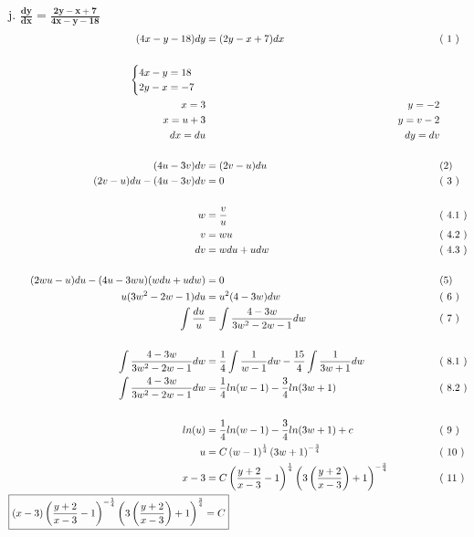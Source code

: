 \documentclass{article}
\newcommand{\newLine}[3]{ #1 & = #2 && \text{(#3)}\\ }
\newcommand{\finalAnswer}[2]{ \Aboxed{ #1 & = #2 } }
\newcommand{\p}[1]{ \left( #1 \right) }
\newcommand{\newProblem}[2]{ \hspace{10mm} #1. $
\boldsymbol{ #2 }
$  \break }
\begin{document}
\begin{flushleft}
        \newProblem{j}{ \frac{dy}{dx} = \frac{2y-x+7}{4x-y-18} }
            \begin{align*}
                \newLine{ ( 4x-y-18 )dy } { (2y-x+7)dx } { 1 }
                \\
                    \begin{cases}
                        4x - y = 18\\
                        2y - x = -7
                    \end{cases}\\
                x = 3 && y = -2 \\
                x = u + 3 && y = v -2 \\
                dx = du && dy = dv\\
                \\
                \newLine{ ( 4u - 3v )dv } { (2v-u)du } {2}
                \newLine{ (2v-u)du - ( 4u - 3v )dv } { 0 } { 3 }
                \\
                \newLine{ w } { \frac{v}{u} } { 4.1 }
                \newLine{ v } { wu } { 4.2 }
                \newLine{ dv } { wdu + udw } { 4.3 }
                \\
                \newLine{ (2wu-u)du -(4u-3wu)(wdu+udw) } { 0 } {5}
                \newLine{ u(3w^2 -2w-1)du } { u^2(4-3w)dw } { 6 }
                \newLine{ \int \frac{du}{u} } { \int \frac{4-3w}{3w^2-2w-1} dw } { 7 }
                \\
                    \newLine{ \int \frac{4-3w}{3w^2-2w-1} dw  } { \frac{1}{4}\int \frac{1}{w-1}dw - \frac{15}{4}\int \frac{1}{3w+1} dw } { 8.1 }
                    \newLine{ \int \frac{4-3w}{3w^2-2w-1} dw } { \frac{1}{4}ln(w-1) - \frac{3}{4}ln(3w+1) } { 8.2 }
                \\
                \newLine{ ln(u) } { \frac{1}{4}ln(w-1) - \frac{3}{4}ln(3w+1) + c} { 9 }
                \newLine{ u } { C\p{w-1}^{\frac{1}{4}} \p{3w+1}^{-\frac{3}{4}} } { 10 }
                \newLine{ x-3 } { C \p{\frac{y+2}{x-3}-1}^{\frac{1}{4}} \p{3\p{\frac{y+2}{x-3}}+1}^{-\frac{3}{4}} } { 11 }
                \finalAnswer{ \p{x-3} \p{\frac{y+2}{x-3}-1}^{-\frac{1}{4}} \p{3\p{\frac{y+2}{x-3}}+1}^{\frac{3}{4}} }{ C }
            \end{align*}


\end{flushleft}
\end{document}
